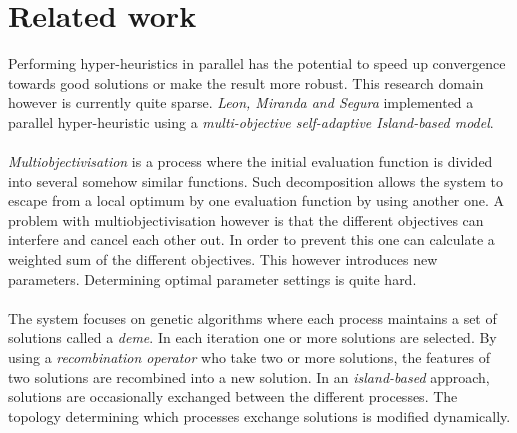 \documentclass[a4paper,10pt]{article}
\newcommand{\seclab}[1]{\label{sec:#1}}
\newcommand{\secref}[1]{\ref{sec:#1}}
\theoremstyle{definition}
\begin{document}
% 

\section{Related work}
\seclab{parhyp}

Performing hyper-heuristics in parallel has the potential to speed up convergence towards good solutions or make the result more robust. This research domain however is currently quite sparse. \emph{Leon, Miranda and Segura}\cite{} implemented a parallel hyper-heuristic using a \emph{multi-objective self-adaptive Island-based model}.

\paragraph{}
\emph{Multiobjectivisation} is a process where the initial evaluation function is divided into several somehow similar functions. Such decomposition allows the system to escape from a local optimum by one evaluation function by using another one. A problem with multiobjectivisation however is that the different objectives can interfere and cancel each other out. In order to prevent this one can calculate a weighted sum of the different objectives. This however introduces new parameters. Determining optimal parameter settings is quite hard.

\paragraph{}
The system focuses on genetic algorithms where each process maintains a set of solutions called a \emph{deme}. In each iteration one or more solutions are selected. By using a \emph{recombination operator} who take two or more solutions, the features of two solutions are recombined into a new solution. In an \emph{island-based} approach, solutions are occasionally exchanged between the different processes. The topology determining which processes exchange solutions is modified dynamically.
\end{document}
